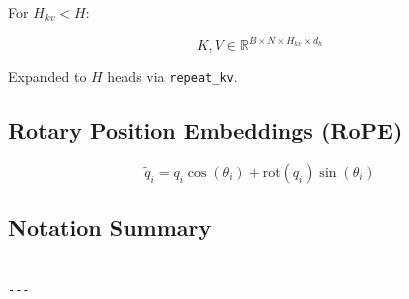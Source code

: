 For $H_{kv} < H$:

\[
K, V \in \mathbb{R}^{B \times N \times H_{kv} \times d_h}
\tag{3.11}
\]

Expanded to $H$ heads via \texttt{repeat\_kv}.

\subsection{Rotary Position Embeddings (RoPE)}

\[
\tilde{q}_i = q_i \cos(\theta_i) + \text{rot}(q_i) \sin(\theta_i)
\tag{3.12}
\]

\subsection{Notation Summary}

\begin{lstlisting}

---
\end{lstlisting}